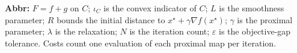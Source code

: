\begin{table}[tp]
\begin{threeparttable}
\begin{tabularx}{\linewidth}{@{}>{\raggedright\arraybackslash}p{0.20\linewidth}>{\raggedright\arraybackslash}p{0.32\linewidth}>{\raggedright\arraybackslash}p{0.25\linewidth}>{\raggedright\arraybackslash}X@{}}
\\
\bottomrule
\end{tabularx}
\begin{tablenotes}[flushleft]\footnotesize
\item[] \textbf{Abbr:} $F=f+g$ on $C$; $\iota_C$ is the convex indicator of $C$; $L$ is the smoothness parameter; $R$ bounds the initial distance to $x^\star+\gamma\nabla f(x^\star)$; $\gamma$ is the proximal parameter; $\lambda$ is the relaxation; $N$ is the iteration count; $\varepsilon$ is the objective-gap tolerance. Costs count one evaluation of each proximal map per iteration.
\end{tablenotes}
\end{threeparttable}
\end{table}
\clearpage
